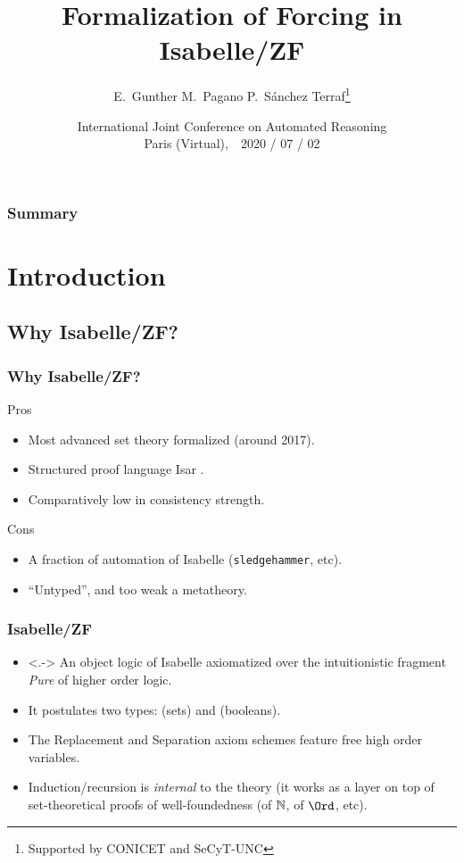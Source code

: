 \documentclass[english]{beamer}
\title[Forcing in Isabelle/ZF]{Formalization of Forcing in Isabelle/ZF}
\author[E.~Gunther, M.~Pagano, PST]{E.~Gunther \qquad M.~Pagano \qquad P.~Sánchez Terraf\thanks{Supported by
    CONICET and SeCyT-UNC} 
}
\institute[UNC]{CIEM-FaMAF --- Universidad Nacional de Córdoba}
\date[IJCAR 2020]{International Joint Conference on Automated
  Reasoning\\ Paris (Virtual),\ \  2020 / 07 / 02}
\begin{document}
\begin{frame}[plain]
  \titlepage
  \begin{center}
    \insertlogo
  \end{center}
\end{frame}
%
\begin{frame}
  \frametitle{Summary}
  \tableofcontents
  \transwipe
\end{frame}
%
\section{Introduction}

\subsection{Why Isabelle/ZF?}

\begin{frame}
  \frametitle{Why Isabelle/ZF?}
  \begin{block}{Pros}
    \begin{itemize}
    \item Most advanced set theory formalized (around 2017).
    \item Structured proof language Isar
      \citep{DBLP:conf/tphol/Wenzel99}.
    \item Comparatively low in consistency strength.
    \end{itemize}
  \end{block}
  \pause
  \begin{block}{Cons}
    \begin{itemize}
    \item A fraction of automation of Isabelle (\texttt{sledgehammer},
      etc).
    \item ``Untyped'', and too weak a metatheory.
    \end{itemize}
  \end{block}
\end{frame}

\begin{frame}
  \frametitle{Isabelle/ZF \citep{DBLP:journals/jar/PaulsonG96}}
  \begin{itemize}
  \item<.-> An object logic of Isabelle axiomatized over the
    intuitionistic fragment  \emph{Pure} of higher order logic.
  \item<+-> It postulates two types: 
    (sets) and  (booleans). 
  \item<+-> The Replacement and Separation axiom schemes feature free
    high order variables.
  \item<+-> Induction/recursion is \emph{internal} to the theory (it works as a
    layer on top of set-theoretical proofs of well-foundedness (of
    $\mathbb{N}$, of $\Ord$, etc).
  \end{itemize}
\end{frame}
\end{document}
